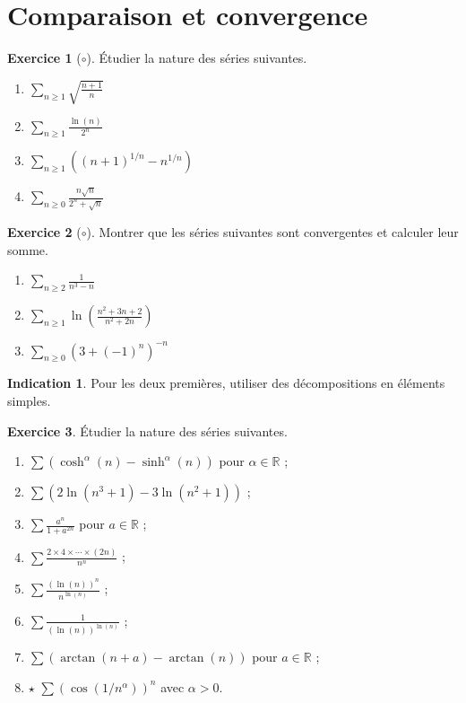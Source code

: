 \documentclass[french]{book}
\newcommand{\R}{\mathbb{R}}
\theoremstyle{definition}
\newtheorem{ex}{Exercice}[chapter]
\theoremstyle{theorem}
\newtheorem*{ind}{Indication}
\theoremstyle{remark}
\begin{document}
\section{Comparaison et convergence}

\begin{ex}[$\circ$]
	Étudier la nature des séries suivantes.
	\begin{enumerate}
		\item $\displaystyle\sum_{n\geqslant 1}\sqrt{\frac{n+1}{n}}$
		\item $\displaystyle\sum_{n\geqslant 1}\frac{\ln(n)}{2^n}$
		\item $\displaystyle\sum_{n\geqslant 1}\left(\left(n+1\right)^{1/n}-n^{1/n}\right)$
		\item $\displaystyle\sum_{n\geqslant 0}\frac{n\sqrt{n}}{2^n+\sqrt{n}}$
	\end{enumerate}
\end{ex}

\begin{ex}[$\circ$]
	Montrer que les séries suivantes sont convergentes et calculer leur somme.
	\begin{enumerate}
		\item $\displaystyle\sum_{n\geqslant 2}\frac{1}{n^3-n}$
		\item $\displaystyle\sum_{n\geqslant 1}\ln\left(\frac{n^2+3n+2}{n^2+2n}\right)$
		\item $\displaystyle\sum_{n\geqslant 0}\left(3+(-1)^n\right)^{-n}$
	\end{enumerate}
\end{ex}

\begin{ind}
	Pour les deux premières, utiliser des décompositions en éléments simples.
\end{ind}

\begin{ex}
	Étudier la nature des séries suivantes.
	\begin{enumerate}
		\item $\displaystyle\sum\left(\cosh^\alpha(n)-\sinh^\alpha(n)\right)$ pour $\alpha\in\R$ ;
		\item $\displaystyle\sum\left(2\ln(n^3+1)-3\ln(n^2+1)\right)$ ;
		\item $\displaystyle\sum\frac{a^n}{1+a^{2n}}$ pour $a\in\R$ ;
		\item $\displaystyle\sum\frac{2\times 4\times\cdots\times(2n)}{n^n}$ ;
		\item $\displaystyle\sum\frac{\left(\ln(n)\right)^n}{n^{\ln(n)}}$ ;
		\item $\displaystyle\sum\frac{1}{(\ln(n))^{\ln(n)}}$ ;
		\item $\displaystyle\sum\left(\arctan(n+a)-\arctan(n)\right)$ pour $a\in\R$ ;
		\item $\star$ $\displaystyle\sum\left(\cos(1/n^\alpha)\right)^n$ avec $\alpha>0$.
	\end{enumerate}
\end{ex}
\end{document}
